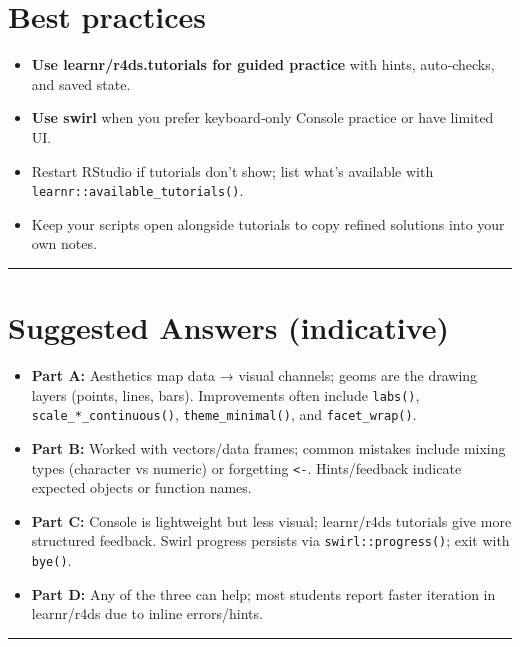 \documentclass[
  letterpaper,
  DIV=11,
  numbers=noendperiod]{scrreprt}
\providecommand{\tightlist}{%
  \setlength{\itemsep}{0pt}\setlength{\parskip}{0pt}}
\begin{document}
\section{Best practices}\label{best-practices-1}

\begin{itemize}
\tightlist
\item
  \textbf{Use learnr/r4ds.tutorials for guided practice} with hints,
  auto‑checks, and saved state.
\item
  \textbf{Use swirl} when you prefer keyboard‑only Console practice or
  have limited UI.
\item
  Restart RStudio if tutorials don't show; list what's available with
  \texttt{learnr::available\_tutorials()}.
\item
  Keep your scripts open alongside tutorials to copy refined solutions
  into your own notes.
\end{itemize}

\begin{center}\rule{0.5\linewidth}{0.5pt}\end{center}

\section{Suggested Answers
(indicative)}\label{suggested-answers-indicative-1}

\begin{itemize}
\tightlist
\item
  \textbf{Part A:} Aesthetics map data → visual channels; geoms are the
  drawing layers (points, lines, bars). Improvements often include
  \texttt{labs()}, \texttt{scale\_*\_continuous()},
  \texttt{theme\_minimal()}, and \texttt{facet\_wrap()}.
\item
  \textbf{Part B:} Worked with vectors/data frames; common mistakes
  include mixing types (character vs numeric) or forgetting
  \texttt{\textless{}-}. Hints/feedback indicate expected objects or
  function names.
\item
  \textbf{Part C:} Console is lightweight but less visual; learnr/r4ds
  tutorials give more structured feedback. Swirl progress persists via
  \texttt{swirl::progress()}; exit with \texttt{bye()}.
\item
  \textbf{Part D:} Any of the three can help; most students report
  faster iteration in learnr/r4ds due to inline errors/hints.
\end{itemize}

\begin{center}\rule{0.5\linewidth}{0.5pt}\end{center}
\end{document}
